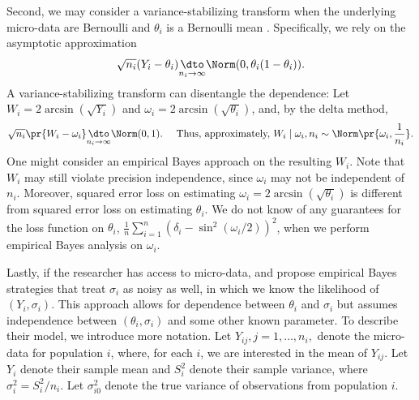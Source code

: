 \documentclass[12pt, reqno]{amsart}
\numberwithin{equation}{section}
\begin{document}
\begin{refsection}
\begin{appendices}
\begin{altsq}

Second, we may consider a variance-stabilizing transform when the underlying micro-data are
Bernoulli and $\theta_i$ is a Bernoulli mean
\citep{efron1975data,10.1214/07-AOAS138}. Specifically, we rely on the asymptotic
 approximation \[
\sqrt{n_i} (Y_i - \theta_i)\underset{n_i\to\infty}{\dto} \Norm(0, \theta_i (1-\theta_i)).
\]
A variance-stabilizing transform can disentangle the dependence: Let
$W_i = 2\arcsin(\sqrt{Y_i})$ and $\omega_i = 2\arcsin(\sqrt{\theta_i})$, and, by the delta
method, \[
\sqrt{n_i} \pr{W_i - \omega_i} \underset{n_i\to\infty}{\dto} \Norm(0, 1). \quad \text{
Thus, approximately, } W_i \mid \omega_i, n_i \sim \Norm\pr{\omega_i, \frac{1}{n_i}}.
\] One might consider an empirical Bayes approach on the resulting $W_i$. Note that $W_i$
 may still violate precision independence, since $\omega_i$ may not be independent of
 $n_i$.
 Moreover, squared error loss on estimating $\omega_i = 2\arcsin(\sqrt{\theta_i})$ is
 different from squared error loss on estimating $\theta_i$. We do not know of any
 guarantees for the loss function on $\theta_i$, $\frac{1}{n} \sum_ {i=1}^n
 (\delta_i - \sin^2 (\omega_i / 2))^2$, when we perform empirical Bayes analysis on
 $\omega_i$.
\end{altsq}

\begin{altsq}
\label{alt:gukoenker}
Lastly, if the researcher has access to micro-data,
\citet{gu2017empirical} and \citet{fu2020nonparametric} propose empirical Bayes strategies
that treat $\sigma_i$ as noisy as well, in which we know the likelihood of $(Y_i,
\sigma_i)$. This approach allows for dependence between $\theta_i$ and $\sigma_i$ but
assumes independence between $(\theta_i, \sigma_i)$ and some other known 
 parameter. To describe their model, we introduce more notation. Let $Y_
 {ij}, j=1,\ldots,n_i,$ denote the micro-data for population $i$, where, for each $i$, we
 are interested in the mean of $Y_{ij}$. Let $Y_i$ denote their sample mean and $S_i^2$
 denote their sample variance, where $\sigma_i^2 = S_i^2/n_i$. Let $\sigma_{i0}^2$ denote
 the true variance of observations from population $i$.


\end{altsq}
\end{appendices}
\end{refsection}
\end{document}

